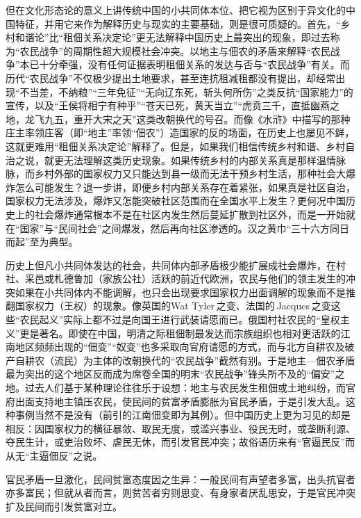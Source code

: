 \documentclass[a4paper,12pt,punct=kaiming,fontset=none]{ctexart}
\begin{document}
但在文化形态论的意义上讲传统中国的小共同体本位、把它视为区别于异文化的中国特征，并用它来作为解释历史与现实的主要基础，则是很可质疑的。首先，“乡村和谐论”比“租佃关系决定论”更无法解释中国历史上最突出的现象，即过去称为“农民战争”的周期性超大规模社会冲突。以地主与佃农的矛盾来解释“农民战争”本已十分牵强，没有任何证据表明租佃关系的发达与否与“农民战争”有关。而历代“农民战争”不仅极少提出土地要求，甚至连抗租减租都没有提出，却经常出现“不当差，不纳粮”“三年免征”“无向辽东死，斩头何所伤”之类反抗“国家能力”的宣传，以及“王侯将相宁有种乎”“苍天已死，黄天当立”“虎贲三千，直抵幽燕之地，龙飞九五，重开大宋之天”这类改朝换代的号召。而像《水浒》中描写的那种庄主率领庄客（即“地主”率领“佃农”）造国家的反的场面，在历史上也屡见不鲜，这就更难用“租佃关系决定论”解释了。但是，如果我们相信传统乡村和谐、乡村自治之说，就更无法理解这类历史现象。如果传统乡村的内部关系真是那样温情脉脉，而乡村外部的国家权力又只能达到县一级而无法干预乡村生活，那种社会大爆炸怎么可能发生？退一步讲，即便乡村内部关系存在着紧张，如果真是社区自治，国家权力无法涉及，爆炸又怎能突破社区范围而在全国水平上发生？更何况中国历史上的社会爆炸通常根本不是在社区内发生然后蔓延扩散到社区外，而是一开始就在“国家”与“民间社会”之间爆发，然后再向社区渗透的。汉之黄巾“三十六方同日而起”至为典型。

历史上但凡小共同体发达的社会，共同体内部矛盾极少能扩展成社会爆炸，在村社、采邑或札德鲁加（家族公社）活跃的前近代欧洲，农民与他们的领主发生的冲突如果在小共同体内不能调解，也只会出现要求国家权力出面调解的现象而不是推翻国家权力（王权）的现象。像英国的Wat Tyler 之变、法国的 Jacques 之变这些“农民起义”实际上都不过是向国王进行武装请愿而已。俄国村社农民的“皇权主义”更是著名。即使在中国，明清之际租佃制最发达而宗族组织也相对更活跃的江南地区频频出现的“佃变”“奴变”也多采取向官府请愿的方式，而与北方自耕农及破产自耕农（流民）为主体的改朝换代的“农民战争”截然有别。于是地主—佃农矛盾最为突出的这个地区反而成为席卷全国的明末“农民战争”锋头所不及的“偏安”之地。过去人们基于某种理论往往乐于设想：地主与农民发生租佃或土地纠纷，而官府出面支持地主镇压农民，使民间的贫富矛盾膨胀为官民矛盾，于是引发大乱。这种事例当然不是没有（前引的江南佃变即为其例）。但中国历史上更为习见的却是相反：因国家权力的横征暴敛、取民无度，或滥兴事业、役民无时，或垄断利源、夺民生计，或吏治败坏、虐民无休，而引发官民冲突；故俗语历来有“官逼民反”而从无“主逼佃反”之说。

官民矛盾一旦激化，民间贫富态度因之生异：一般民间有声望者多富，出头抗官者亦多富民；但就从者而言，则贫苦者穷则思变、有身家者厌乱思安，于是官民冲突扩及民间而引发贫富对立。
\end{document}
